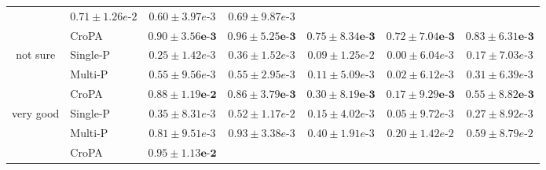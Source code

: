 \begin{table}[ht]
{\begin{tabular}{clccccc}
 & $0.71\scriptscriptstyle \pm \scriptstyle1.26e\text{-}2$
 & $0.60\scriptscriptstyle \pm \scriptstyle3.97e\text{-}3$
 & $0.69\scriptscriptstyle \pm \scriptstyle9.87e\text{-}3$ \\
 & \small{CroPA} 
 & $\mathbf{0.90\scriptscriptstyle \pm \scriptstyle3.56e\text{-}3}$
 & $\mathbf{0.96\scriptscriptstyle \pm \scriptstyle5.25e\text{-}3}$
 & $\mathbf{0.75\scriptscriptstyle \pm \scriptstyle8.34e\text{-}3}$
 & $\mathbf{0.72\scriptscriptstyle \pm \scriptstyle7.04e\text{-}3}$
 & $\mathbf{0.83\scriptscriptstyle \pm \scriptstyle6.31e\text{-}3}$ \\
\hline
\multirow{3}{*}{\small{not sure}}
 & \small{Single-P} 
 & $0.25\scriptscriptstyle \pm \scriptstyle1.42e\text{-}3$
 & $0.36\scriptscriptstyle \pm \scriptstyle1.52e\text{-}3$
 & $0.09\scriptscriptstyle \pm \scriptstyle1.25e\text{-}2$
 & $0.00\scriptscriptstyle \pm \scriptstyle6.04e\text{-}3$
 & $0.17\scriptscriptstyle \pm \scriptstyle7.03e\text{-}3$ \\
 & \small{Multi-P} 
 & $0.55\scriptscriptstyle \pm \scriptstyle9.56e\text{-}3$
 & $0.55\scriptscriptstyle \pm \scriptstyle2.95e\text{-}3$
 & $0.11\scriptscriptstyle \pm \scriptstyle5.09e\text{-}3$
 & $0.02\scriptscriptstyle \pm \scriptstyle6.12e\text{-}3$
 & $0.31\scriptscriptstyle \pm \scriptstyle6.39e\text{-}3$ \\
 & \small{CroPA} 
 & $\mathbf{0.88\scriptscriptstyle \pm \scriptstyle1.19e\text{-}2}$
 & $\mathbf{0.86\scriptscriptstyle \pm \scriptstyle3.79e\text{-}3}$
 & $\mathbf{0.30\scriptscriptstyle \pm \scriptstyle8.19e\text{-}3}$
 & $\mathbf{0.17\scriptscriptstyle \pm \scriptstyle9.29e\text{-}3}$
 & $\mathbf{0.55\scriptscriptstyle \pm \scriptstyle8.82e\text{-}3}$ \\
\hline
\multirow{3}{*}{\small{very good}}
 & \small{Single-P} 
 & $0.35\scriptscriptstyle \pm \scriptstyle8.31e\text{-}3$
 & $0.52\scriptscriptstyle \pm \scriptstyle1.17e\text{-}2$
 & $0.15\scriptscriptstyle \pm \scriptstyle4.02e\text{-}3$
 & $0.05\scriptscriptstyle \pm \scriptstyle9.72e\text{-}3$
 & $0.27\scriptscriptstyle \pm \scriptstyle8.92e\text{-}3$ \\
 & \small{Multi-P} 
 & $0.81\scriptscriptstyle \pm \scriptstyle9.51e\text{-}3$
 & $0.93\scriptscriptstyle \pm \scriptstyle3.38e\text{-}3$
 & $0.40\scriptscriptstyle \pm \scriptstyle1.91e\text{-}3$
 & $0.20\scriptscriptstyle \pm \scriptstyle1.42e\text{-}2$
 & $0.59\scriptscriptstyle \pm \scriptstyle8.79e\text{-}2$ \\
 & \small{CroPA} 
 & $\mathbf{0.95\scriptscriptstyle \pm \scriptstyle1.13e\text{-}2}$

\end{tabular}}
\end{table}
